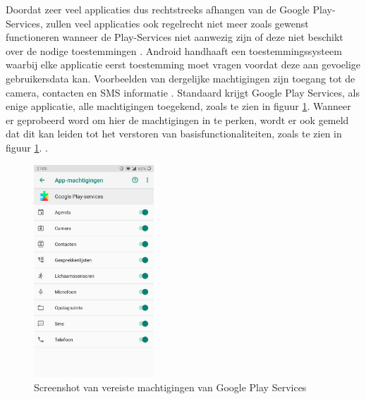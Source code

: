 Doordat zeer veel applicaties dus rechtstreeks afhangen van de Google Play-Services, zullen veel applicaties ook regelrecht niet meer zoals gewenst functioneren wanneer de Play-Services niet aanwezig zijn of deze niet beschikt over de nodige toestemmingen \autocite{marshall_google-play-services}. Android handhaaft een toestemmingssysteem waarbij elke applicatie eerst toestemming moet vragen voordat deze aan gevoelige gebruikersdata kan. Voorbeelden van dergelijke machtigingen zijn toegang tot de camera, contacten en SMS informatie \autocite{android_permissions}. Standaard krijgt Google Play Services, als enige applicatie, alle machtigingen toegekend, zoals te zien in figuur \ref{fig:permissions1}. Wanneer er geprobeerd word om hier de machtigingen in te perken, wordt er ook gemeld dat dit kan leiden tot het verstoren van basisfunctionaliteiten, zoals te zien in figuur \ref{fig:permissions1}. .

\begin{figure}
    \includegraphics[width=0.4\textwidth]{img/machtigingen.jpg}
    \caption{Screenshot van vereiste machtigingen van Google Play Services}
    \label{fig:permissions1}
\end{figure}

